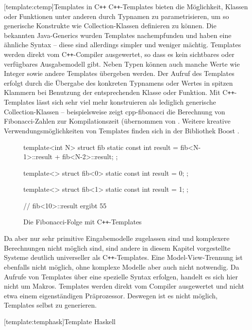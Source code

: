 \documentclass[12pt, a4paper, bibgerm]{scrbook}
\newenvironment{DIFnomarkup}{}{}
\newcommand\lsection{}
\newcommand\abb{}
\newcommand{\cpp}{C\texttt{++}}
\begin{document}
\lsection[template:ctemp]{Templates in \cpp{}} \cpp{}-Templates bieten
die Möglichkeit, Klassen oder Funktionen unter anderen durch Typnamen zu
parametrisieren, um so generische Konstrukte wie Collection-Klassen
definieren zu können. Die bekannten Java-Generics  \cite{JavaGenerics}
wurden Templates nachempfunden und haben eine ähnliche Syntax -- diese
sind allerdings simpler und weniger mächtig. Templates werden direkt vom
\cpp{}-Compiler ausgewertet, so dass es kein sichtbares oder verfügbares
Ausgabemodell gibt. Neben Typen können auch manche Werte wie Integer
sowie andere Templates übergeben werden. Der Aufruf des Templates
erfolgt durch die Übergabe des konkreten Typnamens oder Wertes in
spitzen Klammern bei Benutzung der entsprechenden Klasse oder
Funktion. Mit \cpp{}-Templates lässt sich sehr viel mehr konstruieren
als lediglich generische Collection-Klassen -- beispielsweise zeigt
\abb{cpp-fibonacci} die Berechnung von Fibonacci-Zahlen zur
Kompilationszeit (übernommen von \cite{CppFib}. Weitere kreative
Verwendungsmöglichkeiten von Templates finden sich in der Bibliothek
Boost \cite{Boost}.
\begin{figure}
  \centering
  \begin{DIFnomarkup}\begin{code}
template<int N> struct fib {
  static const int result = fib<N-1>::result + fib<N-2>::result;
};

template<> struct fib<0> {
  static const int result = 0;
};

template<> struct fib<1> {
  static const int result = 1;
};

// fib<10>::result ergibt 55
  \end{code}\end{DIFnomarkup}
  \caption{Die Fibonacci-Folge mit \cpp{}-Templates}
  \label{magicl:fig:cpp-fibonacci}
\end{figure}
Da aber nur sehr primitive Eingabemodelle zugelassen sind und komplexere
Berechnungen nicht möglich sind, sind andere in diesem Kapitel
vorgestellte Systeme deutlich universeller als \cpp{}-Templates. Eine
Model-View-Trennung ist ebenfalls nicht möglich, ohne komplexe Modelle
aber auch nicht notwendig. Da Aufrufe von Templates über eine spezielle
Syntax erfolgen, handelt es sich hier nicht um Makros. Templates werden
direkt vom Compiler ausgewertet und nicht etwa einem eigenständigen
Präprozessor. Deswegen ist es nicht möglich, Templates selbst zu
generieren.

\lsection[template:temphask]{Template Haskell}
\end{document}
